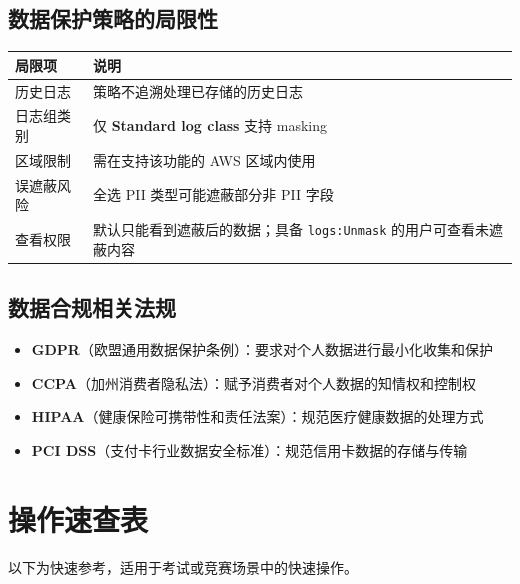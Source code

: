 \documentclass[12pt, a4paper]{article}
\begin{document}
\subsection{数据保护策略的局限性}

\begin{center}
\begin{tabular}{@{}p{5cm}p{9cm}@{}}
\toprule
\textbf{局限项} & \textbf{说明} \\
\midrule
历史日志 & 策略不追溯处理已存储的历史日志 \\
日志组类别 & 仅 \textbf{Standard log class} 支持 masking \\
区域限制 & 需在支持该功能的 AWS 区域内使用 \\
误遮蔽风险 & 全选 PII 类型可能遮蔽部分非 PII 字段 \\
查看权限 & 默认只能看到遮蔽后的数据；具备 \texttt{logs:Unmask} 的用户可查看未遮蔽内容 \\
\bottomrule
\end{tabular}
\end{center}

\subsection{数据合规相关法规}

\begin{itemize}[leftmargin=2em]
  \item \textbf{GDPR}（欧盟通用数据保护条例）：要求对个人数据进行最小化收集和保护
  \item \textbf{CCPA}（加州消费者隐私法）：赋予消费者对个人数据的知情权和控制权
  \item \textbf{HIPAA}（健康保险可携带性和责任法案）：规范医疗健康数据的处理方式
  \item \textbf{PCI DSS}（支付卡行业数据安全标准）：规范信用卡数据的存储与传输
\end{itemize}

\newpage

\section{操作速查表}

\begin{tipbox}
  以下为快速参考，适用于考试或竞赛场景中的快速操作。
\end{tipbox}
\end{document}

